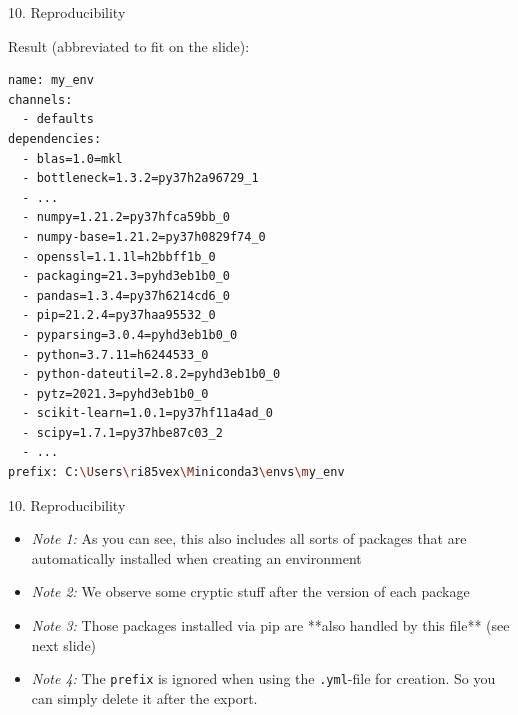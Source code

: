 \begin{vbframe}{10. Reproducibility}

\vfill

Result (abbreviated to fit on the slide):

\scriptsize

\begin{lstlisting}[language=bash,basicstyle=\tiny\ttfamily]
name: my_env
channels:
  - defaults
dependencies:
  - blas=1.0=mkl
  - bottleneck=1.3.2=py37h2a96729_1
  - ...
  - numpy=1.21.2=py37hfca59bb_0
  - numpy-base=1.21.2=py37h0829f74_0
  - openssl=1.1.1l=h2bbff1b_0
  - packaging=21.3=pyhd3eb1b0_0
  - pandas=1.3.4=py37h6214cd6_0
  - pip=21.2.4=py37haa95532_0
  - pyparsing=3.0.4=pyhd3eb1b0_0
  - python=3.7.11=h6244533_0
  - python-dateutil=2.8.2=pyhd3eb1b0_0
  - pytz=2021.3=pyhd3eb1b0_0
  - scikit-learn=1.0.1=py37hf11a4ad_0
  - scipy=1.7.1=py37hbe87c03_2
  - ...
prefix: C:\Users\ri85vex\Miniconda3\envs\my_env
\end{lstlisting}

\vfill

\end{vbframe}


\begin{vbframe}{10. Reproducibility}

\vfill

\begin{itemize}
	\item \textit{Note 1:} As you can see, this also includes all sorts of packages that are automatically
  installed when creating an environment
	\item \textit{Note 2:} We observe some cryptic stuff after the version of each package 
  \item \textit{Note 3:} Those packages installed via pip are **also handled by this file** (see next slide)
  \item \textit{Note 4:} The \texttt{prefix} is ignored when using the \texttt{.yml}-file for creation.
  So you can simply delete it after the export.
\end{itemize}

\vfill

\end{vbframe}


